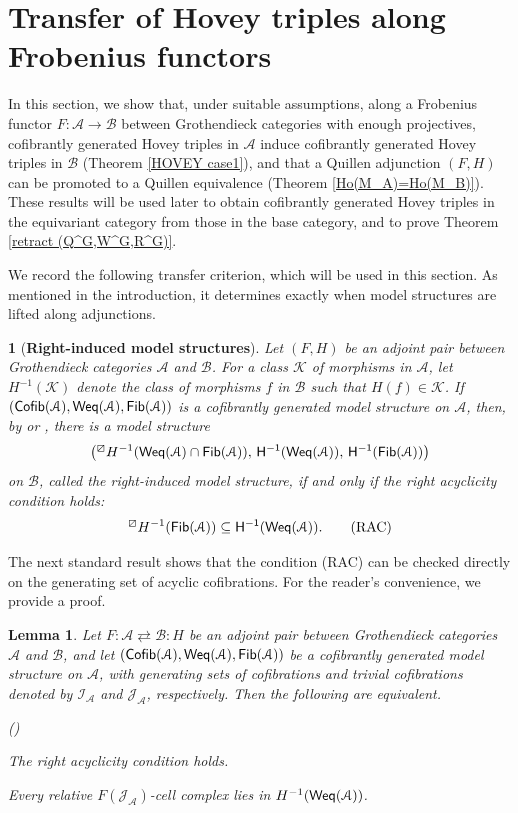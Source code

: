 \documentclass[12pt,twoside]{amsart}
\theoremstyle{bfupright head,slanted body}
\theoremstyle{bfupright head,upright body}
\newtheorem{bfhpg}[res]{}               \newtheorem*{bfhpg*}{}
\theoremstyle{fixed bf head,slanted body}
\newtheorem{lem}[res]{Lemma}            \newtheorem*{lem*}{Lemma}
\theoremstyle{fixed bf head,upright body}
\theoremstyle{numbered paragraph}
\newlength{\thmlistleft}        %
\newlength{\thmlistright}       %
\newlength{\thmlistpartopsep}   %
\newlength{\thmlisttopsep}      %
\newlength{\thmlistparsep}      %
\newlength{\thmlistitemsep}     %
\newcounter{eqc}
\newenvironment{eqc}{\begin{list}{\upshape (\textit{\roman{eqc}})}%
    {\usecounter{eqc}%
      \setlength{\leftmargin}{\thmlistleft}%
      \setlength{\labelwidth}{\thmlistleft}%
      \setlength{\rightmargin}{\thmlistright}%
      \setlength{\partopsep}{\thmlistpartopsep}%
      \setlength{\topsep}{\thmlisttopsep}%
      \setlength{\parsep}{\thmlistparsep}%
      \setlength{\itemsep}{\thmlistitemsep}}}%
  {\end{list}}%
\numberwithin{equation}{res}
\newcommand{\calA}{\mathcal{A}}
\newcommand{\calB}{\mathcal{B}}
\newcommand{\Cofib}{\sf{Cofib}}
\newcommand{\Fib}{\sf{Fib}}
\newcommand{\Weq}{\sf{Weq}}
\begin{document}
\section{Transfer of Hovey triples along Frobenius functors}\label{section Frobenius pair}%
\noindent
In this section, we show that, under suitable assumptions, along a Frobenius functor \(F : \calA \to \calB\) between Grothendieck categories with enough projectives, cofibrantly generated Hovey triples in \(\calA\) induce cofibrantly generated Hovey triples in \(\calB\) (Theorem \ref{HOVEY case1}), and that a Quillen adjunction \((F, H)\) can be promoted to a Quillen equivalence (Theorem \ref{Ho(M_A)=Ho(M_B)}).
These results will be used later to obtain cofibrantly generated Hovey triples in the equivariant category from those in the base category, and to prove Theorem \ref{retract (Q^G,W^G,R^G)}.

We record the following transfer criterion, which will be used in this section. As mentioned in the introduction, it determines exactly when model structures are lifted along adjunctions.

\begin{bfhpg}[\bf Right-induced model structures]\label{ex for rim}
Let \((F,H)\) be an adjoint pair between Grothendieck categories \(\calA\) and \(\calB\). For a class \(\mathcal K\) of morphisms in \(\mathcal A\), let \(H^{-1}(\mathcal K)\) denote the class of morphisms \(f\) in \(\mathcal B\) such that \(H(f)\in\mathcal K\). If \((\Cofib(\mathcal A),\Weq(\mathcal A),\Fib(\mathcal A))\) is a cofibrantly generated model structure on \(\mathcal A\), then, by \cite[Corollary 2.7]{20GKR} or \cite[Corollary 3.3.4]{KMEB}, there is a model structure
\[
\bigl({}^{\boxslash}H^{-1}(\Weq(\mathcal A)\cap\Fib(\mathcal A)),\,
H^{-1}(\Weq(\mathcal A)),\,
H^{-1}(\Fib(\mathcal A))\bigr)
\]
on \(\mathcal B\), called the \emph{right-induced} model structure, if and only if the \emph{right acyclicity condition} holds:
\[
{}^{\boxslash}H^{-1}(\Fib(\mathcal A)) \subseteq H^{-1}(\Weq(\mathcal A)). \tag{RAC}
\]
\end{bfhpg}

The next standard result shows that the condition (RAC) can be checked directly on the generating set of acyclic cofibrations. For the reader's convenience, we provide a proof.

\begin{lem}\label{acyclicity condition}
Let \(F:\calA\rightleftarrows\calB:H\) be an adjoint pair between Grothendieck categories \(\mathcal A\) and \(\mathcal B\), and let \((\Cofib(\mathcal A),\Weq(\mathcal A),\Fib(\mathcal A))\) be a cofibrantly generated model structure on \(\mathcal A\), with generating sets of cofibrations and trivial cofibrations denoted by \(\mathcal I_{\mathcal A}\) and \(\mathcal J_{\mathcal A}\), respectively.
Then the following are equivalent.
\begin{eqc}
  \item The right acyclicity condition  holds.
  \item Every relative \(F(\mathcal J_{\mathcal A})\)-cell complex lies in \(H^{-1}(\Weq(\mathcal A))\).
\end{eqc}
\end{lem}
\end{document}

